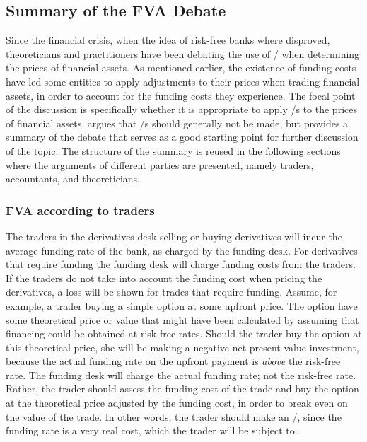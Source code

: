 \documentclass[./sub-main.tex]{subfiles}
\begin{document}
    \subsection{Summary of the FVA Debate}
        Since the financial crisis, when the idea of risk-free banks where disproved,
        theoreticians and practitioners have been debating the use of \FVA/
        when determining the prices of financial assets.
        As mentioned earlier, the existence of funding costs have led some entities 
        to apply adjustments to their prices when trading financial assets, 
        in order to account for the funding costs they experience.
        The focal point of the discussion is specifically 
        whether it is appropriate to apply \FVA/s to the prices of financial assets.
        \cite{HullWhiteFVA} argues that \FVA/s should generally not be made,
        but provides a summary of the debate that serves as a good starting point for further discussion of the topic.
        The structure of the summary is reused in the following sections
        where the arguments of different parties are presented,
        namely traders, accountants, and theoreticians.

        \subsubsection{FVA according to traders}
            The traders in the derivatives desk selling or buying derivatives 
            will incur the average funding rate of the bank, as charged by the funding desk.
            For derivatives that require funding the funding desk will charge funding costs from the traders.
            If the traders do not take into account the funding cost when pricing the derivatives,
            a loss will be shown for trades that require funding.
            Assume, for example, a trader buying a simple option at some upfront price.
            The option have some theoretical price or value that might have been calculated by assuming
            that financing could be obtained at risk-free rates. 
            Should the trader buy the option at this theoretical price, 
            she will be making a negative net present value investment, 
            because the actual funding rate on the upfront payment is \textit{above} the risk-free rate. 
            The funding desk will charge the actual funding rate; not the risk-free rate.
            Rather, the trader should assess the funding cost of the trade 
            and buy the option at the theoretical price adjusted by the funding cost,
            in order to break even on the value of the trade.
            In other words, the trader should make an \FVA/, 
            since the funding rate is a very real cost, which the trader will be subject to.
            
\end{document}
